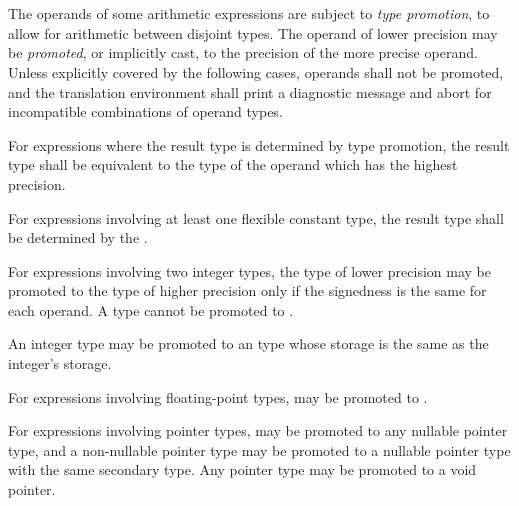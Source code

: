
\begin{grammar}
 \\
	 \\
	 \\
	 \\
	 \\
	 \\
	 \\
\end{grammar}


\specsubitem
The operands of some arithmetic expressions are subject to \textit{type
promotion}, to allow for arithmetic between disjoint types. The operand of
lower precision may be \textit{promoted}, or implicitly cast, to the precision
of the more precise operand. Unless explicitly covered by the following cases,
operands shall not be promoted, and the translation environment shall print a
diagnostic message and abort for incompatible combinations of operand types.

\specsubitem
For expressions where the result type is determined by type promotion, the
result type shall be equivalent to the type of the operand which has the
highest precision.

\specsubitem
For expressions involving at least one flexible constant type, the result type
shall be determined by the .

\specsubitem
For expressions involving two integer types, the type of lower precision may be
promoted to the type of higher precision only if the signedness is the same for
each operand. A type cannot be promoted to .

\specsubitem
An integer type may be promoted to an  type whose storage is the
same as the integer's storage.

\specsubitem
For expressions involving floating-point types,  may be promoted
to .

\specsubitem
For expressions involving pointer types,  may be promoted to any
nullable pointer type, and a non-nullable pointer type may be promoted to
a nullable pointer type with the same secondary type. Any pointer type may be
promoted to a void pointer.

